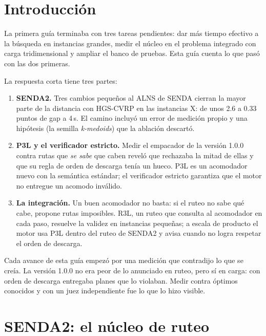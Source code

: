 \documentclass[11pt,a4paper]{article}
\newcommand{\senda}{SENDA}
\newcommand{\sendados}{SENDA2}
\begin{document}
\section{Introducción}
\label{sec:intro}

La primera guía terminaba con tres tareas pendientes: dar más tiempo efectivo a la búsqueda en
instancias grandes, medir el núcleo en el problema integrado con carga tridimensional y ampliar el
banco de pruebas. Esta guía cuenta lo que pasó con las dos primeras.

La respuesta corta tiene tres partes:

\begin{enumerate}[leftmargin=1.5em]
\item \textbf{\sendados.} Tres cambios pequeños al ALNS de \senda{} cierran la mayor parte de la
distancia con HGS-CVRP en las instancias X: de unos 2.6 a 0.33 puntos de gap a 4\,s. El camino incluyó
un error de medición propio y una hipótesis (la semilla \emph{k-medoids}) que la ablación descartó.
\item \textbf{P3L y el verificador estricto.} Medir el empacador de la versión 1.0.0 contra rutas que
\emph{se sabe} que caben reveló que rechazaba la mitad de ellas y que su regla de orden de descarga
tenía un hueco. P3L es un acomodador nuevo con la semántica estándar; el verificador estricto garantiza
que el motor no entregue un acomodo inválido.
\item \textbf{La integración.} Un buen acomodador no basta: si el ruteo no sabe qué cabe, propone rutas
imposibles. R3L, un ruteo que consulta al acomodador en cada paso, resuelve la validez en instancias
pequeñas; a escala de producto el motor usa P3L dentro del ruteo de \sendados{} y avisa cuando no logra
respetar el orden de descarga.
\end{enumerate}

\begin{ideaclave}
Cada avance de esta guía empezó por una medición que contradijo lo que se creía. La versión 1.0.0
no era peor de lo anunciado en ruteo, pero sí en carga: con orden de descarga entregaba planes que lo
violaban. Medir contra óptimos conocidos y con un juez independiente fue lo que lo hizo visible.
\end{ideaclave}

\section{\sendados: el núcleo de ruteo}
\label{sec:sendados}
\end{document}
